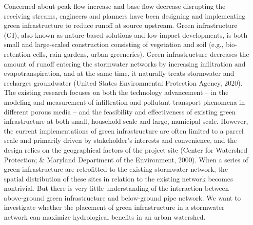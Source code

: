 \documentclass[draft]{agujournal2019}
\begin{document}
Concerned about peak flow increase and base flow decrease disrupting the receiving streams, engineers and planners have been designing and implementing green infrastructure to reduce runoff at source upstream. Green infrastructure (GI), also known as nature-based solutions and low-impact developments, is both small and large-scaled construction consisting of vegetation and soil (e.g., bio-retention cells, rain gardens, urban greeneries). Green infrastructure decreases the amount of runoff entering the stormwater networks by increasing infiltration and evapotranspiration, and at the same time, it naturally treats stormwater and recharges groundwater \cite{}(United States Environmental Protection Agency, 2020). The existing research focuses on both the technology advancement -- in the modeling and measurement of infiltration and pollutant transport phenomena in different porous media \cite{Xu2016, Zhang2018} -- and the feasibility and effectiveness of existing green infrastructure \cite{Avellaneda2017} at both small, household scale and large, municipal scale. However, the current implementations of green infrastructure are often limited to a parcel scale and primarily driven by stakeholder’s interests and convenience, and the design relies on the geographical factors of the project site \cite{}(Center for Watershed Protection; \& Maryland Department of the Environment, 2000). When a series of green infrastructure are retrofitted to the existing stormwater network, the spatial distribution of these sites in relation to the existing network becomes nontrivial. But there is very little understanding of the interaction between above-ground green infrastructure and below-ground pipe network. We want to investigate whether the placement of green infrastructure in a stormwater network can maximize hydrological benefits in an urban watershed. 


\end{document}
